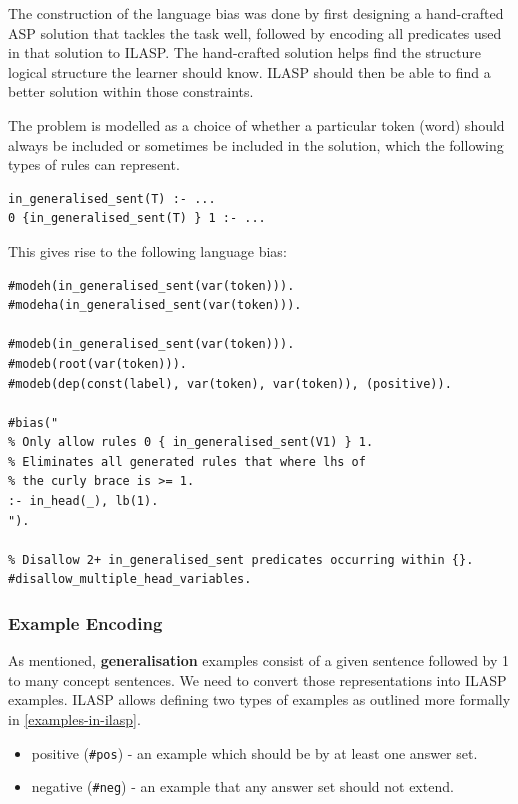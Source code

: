 The construction of the language bias was done by first designing a hand-crafted ASP solution that tackles the task well, followed by encoding all predicates used in that solution to ILASP.
The hand-crafted solution helps find the structure logical structure the learner should know.
ILASP should then be able to find a better solution within those constraints.


The problem is modelled as a choice of whether a particular token (word) should always be included or sometimes be included in the solution, which the following types of rules can represent.
\begin{verbatim}
in_generalised_sent(T) :- ...
0 {in_generalised_sent(T) } 1 :- ...
\end{verbatim}

This gives rise to the following language bias:
\begin{verbatim}
#modeh(in_generalised_sent(var(token))).
#modeha(in_generalised_sent(var(token))).

#modeb(in_generalised_sent(var(token))).
#modeb(root(var(token))).
#modeb(dep(const(label), var(token), var(token)), (positive)).

#bias("
% Only allow rules 0 { in_generalised_sent(V1) } 1.
% Eliminates all generated rules that where lhs of 
% the curly brace is >= 1.
:- in_head(_), lb(1).
").

% Disallow 2+ in_generalised_sent predicates occurring within {}.
#disallow_multiple_head_variables.

\end{verbatim}

\subsubsection{Example Encoding}
\label{example-encoding}

As mentioned, \textbf{generalisation} examples consist of a given sentence followed by 1 to many concept sentences.
We need to convert those representations into ILASP examples.
ILASP allows defining two types of examples as outlined more formally in \ref{examples-in-ilasp}.
\begin{itemize}
    \item positive (\verb_#pos_) - an example which should be by at least one answer set.
    \item negative (\verb_#neg_) - an example that any answer set should not extend.
\end{itemize}

